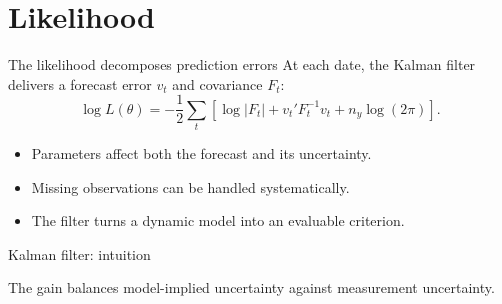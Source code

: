 \documentclass[aspectratio=169,10pt]{beamer}
\begin{document}
\section{Likelihood}
\begin{frame}{The likelihood decomposes prediction errors}
At each date, the Kalman filter delivers a forecast error \(v_t\) and covariance \(F_t\):
\[\log L(\theta)=-\frac12\sum_t\left[\log|F_t|+v_t'F_t^{-1}v_t+n_y\log(2\pi)\right].\]
\begin{itemize}\item Parameters affect both the forecast and its uncertainty.\item Missing observations can be handled systematically.\item The filter turns a dynamic model into an evaluable criterion.\end{itemize}\end{frame}
\begin{frame}{Kalman filter: intuition}\centering{}
\vfill The gain balances model-implied uncertainty against measurement uncertainty.\end{frame}
\end{document}
